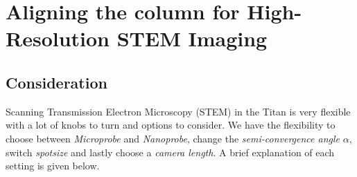 \documentclass[a4paper]{scrartcl}
\begin{document}
\section*{Aligning the column for High-Resolution STEM Imaging}

\subsection*{Consideration}
Scanning Transmission Electron Microscopy (STEM) in the Titan is very flexible with a lot of knobs to turn and options to consider. We have the flexibility to choose between \textit{Microprobe} and \textit{Nanoprobe}, change the \textit{semi-convergence angle} $\alpha$, switch \textit{spotsize} and lastly choose a \textit{camera length}. A brief explanation of each setting is given below.\\
\end{document}
